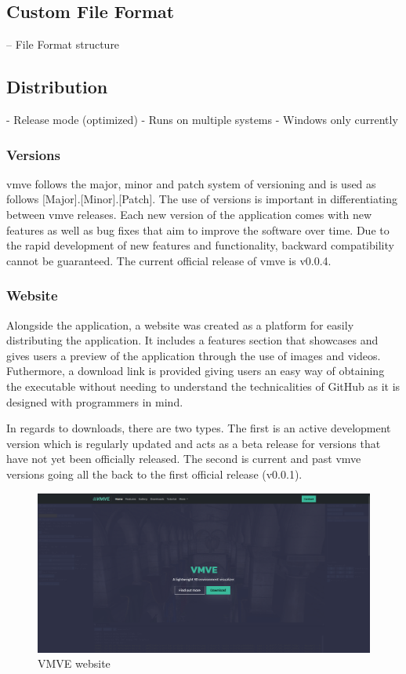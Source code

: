 \documentclass[11pt]{article}
\begin{document}
\subsection{Custom File Format}
-- File Format structure



\subsection{Distribution}
- Release mode (optimized)
- Runs on multiple systems
- Windows only currently

\subsubsection{Versions}
\gls*{vmve} follows the major, minor and patch system of versioning and is used
as follows [Major].[Minor].[Patch]. The use of versions is important in
differentiating between \gls*{vmve} releases. Each new version of the application
comes with new features as well as bug fixes that aim to improve the software
over time. Due to the rapid development of new features and functionality,
backward compatibility cannot be guaranteed. The current official release of
\gls*{vmve} is v0.0.4.

\subsubsection{Website}
Alongside the application, a website was created as a platform for easily
distributing the application. It includes a features section that showcases and
gives users a preview of the application through the use of images and videos.
Futhermore, a download link is provided giving users an easy way of obtaining
the executable without needing to understand the technicalities of GitHub as it
is designed with programmers in mind.

In regards to downloads, there are two types. The first is an active development
version which is regularly updated and acts as a beta release for versions that
have not yet been officially released. The second is current and past \gls*{vmve} versions
going all the back to the first official release (v0.0.1).

\begin{figure}[H]
  \centering
  \includegraphics[width=\textwidth]{images/website.png}
  \caption{VMVE website}
  \label{fig:website}
\end{figure}
\end{document}
